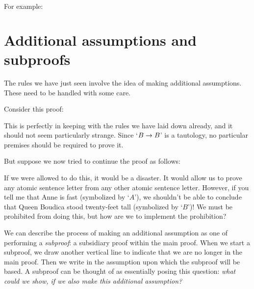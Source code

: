 For example:
	\begin{pf}
		\open
		\close
	\end{pf}



\section{Additional assumptions and subproofs}
The rules we have just seen involve the idea of making additional assumptions. These need to be handled with some care.

Consider this proof:
\begin{pf}
	\hypo{a}{A}
	\open
		\hypo{b1}{B}
		 \Reiteration{b1}
	\close
	\ci{b1-b2}
\end{pf}
This is perfectly in keeping with the rules we have laid down already, and it should not seem particularly strange. Since `$B \rightarrow B$' is a tautology, no particular premises should be required to prove it.

But suppose we now tried to continue the proof as follows:
\begin{pf}
	\open
		 
	\close
\end{pf}
If we were allowed to do this, it would be a disaster. It would allow us to prove any atomic sentence letter from any other atomic sentence letter. However, if you tell me that Anne is fast (symbolized by `$A$'), we shouldn't be able to conclude that Queen Boudica stood twenty-feet tall (symbolized by `$B$')! We must be prohibited from doing this, but how are we to implement the prohibition?

We can describe the process of making an additional assumption as one of performing a \emph{subproof}: a subsidiary proof within the main proof. When we start a subproof, we draw another vertical line to indicate that we are no longer in the main proof. Then we write in the assumption upon which the subproof will be based. A subproof can be thought of as essentially posing this question: \emph{what could we show, if we also make this additional assumption?}


